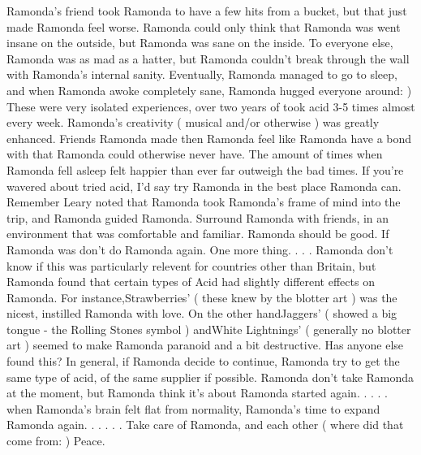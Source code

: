 \documentclass[12pt]{book}
\begin{document}
Ramonda's friend took Ramonda to have a few hits from a bucket, but that just made Ramonda feel worse. Ramonda could only think that Ramonda was went insane on the outside, but Ramonda was sane on the inside. To everyone else, Ramonda was as mad as a hatter, but Ramonda couldn't break through the wall with Ramonda's internal sanity. Eventually, Ramonda managed to go to sleep, and when Ramonda awoke completely sane, Ramonda hugged everyone around: ) These were very isolated experiences, over two years of took acid 3-5 times almost every week. Ramonda's creativity ( musical and/or otherwise ) was greatly enhanced. Friends Ramonda made then Ramonda feel like Ramonda have a bond with that Ramonda could otherwise never have. The amount of times when Ramonda fell asleep felt happier than ever far outweigh the bad times. If you're wavered about tried acid, I'd say try Ramonda in the best place Ramonda can. Remember Leary noted that Ramonda took Ramonda's frame of mind into the trip, and Ramonda guided Ramonda. Surround Ramonda with friends, in an environment that was comfortable and familiar. Ramonda should be good. If Ramonda was don't do Ramonda again. One more thing. . . . Ramonda don't know if this was particularly relevent for countries other than Britain, but Ramonda found that certain types of Acid had slightly different effects on Ramonda. For instance,Strawberries' ( these knew by the blotter art ) was the nicest, instilled Ramonda with love. On the other handJaggers' ( showed a big tongue - the Rolling Stones symbol ) andWhite Lightnings' ( generally no blotter art ) seemed to make Ramonda paranoid and a bit destructive. Has anyone else found this? In general, if Ramonda decide to continue, Ramonda try to get the same type of acid, of the same supplier if possible. Ramonda don't take Ramonda at the moment, but Ramonda think it's about Ramonda started again. . . . . when Ramonda's brain felt flat from normality, Ramonda's time to expand Ramonda again. . . . . . Take care of Ramonda, and each other ( where did that come from: ) Peace.
\end{document}
